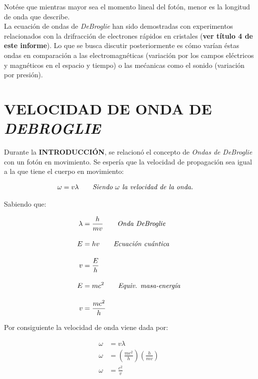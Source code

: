 \documentclass[a4paper]{article}
\begin{document}
        \newpage
        \noindent

        \indent Notése que mientras mayor sea el momento lineal del fotón, menor es la longitud de onda que describe. \\
        \indent La ecuación de ondas de \textit{DeBroglie} han sido demostradas con experimentos relacionados con la drifracción de electrones rápidos en cristales (\textbf{ver título 4 de este informe}). Lo que se busca discutir posteriormente es cómo varían éstas ondas en comparación a las electromagnéticas (variación por los campos eléctricos y magnéticos en el espacio y tiempo) o las mećanicas como el sonido (variación por presión). \\ 

\section{VELOCIDAD DE ONDA DE \textit{DEBROGLIE}}

    \indent Durante la \textbf{INTRODUCCIÓN}, se relacionó el concepto de \textit{Ondas de DeBroglie} con un fotón en movimiento. Se espería que la velocidad de propagación sea igual a la que tiene el cuerpo en movimiento: 

    \begin{align}
    \omega &= v \lambda \tag*{\textit{Siendo $\omega$ la velocidad de la onda.}} 
    \end{align}

    \indent Sabiendo que: 

    \begin{align}
        \lambda &= \frac {h} {mv} \tag*{\textit{Onda DeBroglie}} \\[10pt]
        E &= h v \tag*{\textit{Ecuación cuántica}} \\[10pt]
        v &= \frac {E} {h} \tag*{} \\[10pt]
        E &= mc^2 \tag*{\textit{Equiv. masa-energía}} \\[10pt]
        v &= \frac {mc^2} {h} \tag*{} 
    \end{align}

    \indent Por consiguiente la velocidad de onda viene dada por:

    \begin{align}
        \omega &= v \lambda \tag*{} \\[10pt]
        \omega &= (\frac {m c^2} {h}) (\frac {h} {mv}) \tag*{} \\[10pt]
        \omega &= \frac {c^2} {v} \tag*{}
    \end{align}
       
\end{document}
